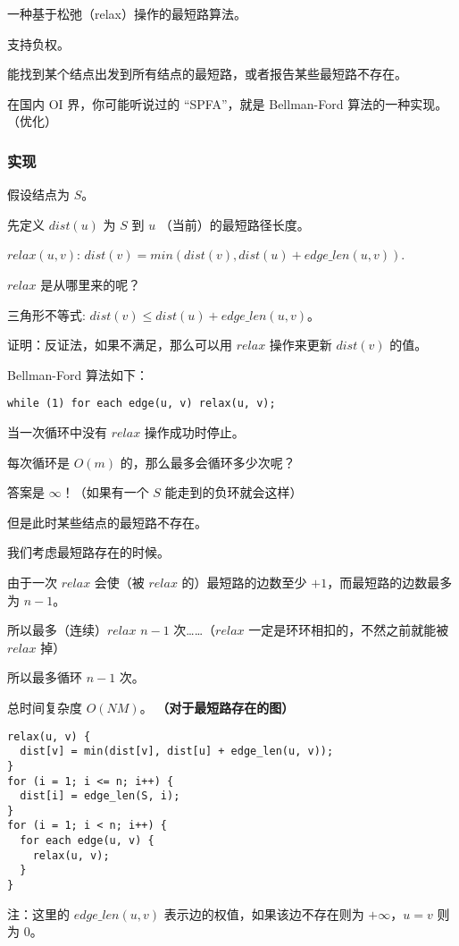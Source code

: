 一种基于松弛（relax）操作的最短路算法。

支持负权。

能找到某个结点出发到所有结点的最短路，或者报告某些最短路不存在。

在国内 OI 界，你可能听说过的 “SPFA”，就是 Bellman-Ford 算法的一种实现。（优化）

\subsubsection{实现}

假设结点为 $S$。

先定义 $dist(u)$ 为 $S$ 到 $u$ （当前）的最短路径长度。

$relax(u,v)$: $dist(v) = min(dist(v), dist(u) + edge\_len(u, v))$.

$relax$ 是从哪里来的呢？

三角形不等式: $dist(v) \leq dist(u) + edge\_len(u, v)$。

证明：反证法，如果不满足，那么可以用 $relax$ 操作来更新 $dist(v)$ 的值。

Bellman-Ford 算法如下：

\begin{verbatim}
while (1) for each edge(u, v) relax(u, v);
\end{verbatim}

当一次循环中没有 $relax$ 操作成功时停止。

每次循环是 $O(m)$ 的，那么最多会循环多少次呢？

答案是 $\infty$！（如果有一个 $S$ 能走到的负环就会这样）

但是此时某些结点的最短路不存在。

我们考虑最短路存在的时候。

由于一次 $relax$ 会使（被 $relax$ 的）最短路的边数至少 $+1$，而最短路的边数最多为 $n-1$。

所以最多（连续）$relax$ $n-1$ 次……（$relax$ 一定是环环相扣的，不然之前就能被 $relax$ 掉）

所以最多循环 $n-1$ 次。

总时间复杂度 $O(NM)$。 \textbf{（对于最短路存在的图）}

\begin{verbatim}
relax(u, v) {
  dist[v] = min(dist[v], dist[u] + edge_len(u, v));
}
for (i = 1; i <= n; i++) {
  dist[i] = edge_len(S, i);
}
for (i = 1; i < n; i++) {
  for each edge(u, v) {
    relax(u, v);
  }
}
\end{verbatim}

注：这里的 $edge\_len(u, v)$ 表示边的权值，如果该边不存在则为 $+\infty$，$u=v$ 则为 $0$。

